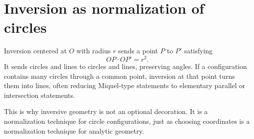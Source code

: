 \section{Inversion as normalization of circles}

Inversion centered at $O$ with radius $r$ sends a point $P$ to $P'$ satisfying
\[
  OP\cdot OP'=r^2.
\]
It sends circles and lines to circles and lines, preserving angles.  If a configuration contains many circles through a common point, inversion at that point turns them into lines, often reducing Miquel-type statements to elementary parallel or intersection statements.

This is why inversive geometry is not an optional decoration.  It is a normalization technique for circle configurations, just as choosing coordinates is a normalization technique for analytic geometry.
